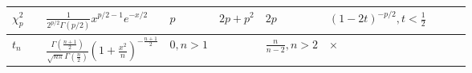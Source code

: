 \documentclass[10pt,landscape]{article}
\begin{document}
\begin{tabular}{llllllllll}
$\chi_p^2$ & $ $ & $\frac{1}{2^{p/2}\Gamma(p/2)}x^{p/2-1}e^{-x/2}$ & $p$ & $2p+p^2$ & $2p$ & $(1-2t)^{-p/2}, t<\frac12$\\
\hline

$t_n$ & $ $ & $\frac{\Gamma(\frac{n+1}2)}{\sqrt{n\pi} \Gamma(\frac{n}2)} (1+\frac{x^2}n)^{-\frac{n+1}2}$ & $0,n>1$ & $ $ & $\frac{n}{n-2},n>2$ & $\times$\\
\hline
\end{tabular}
\end{document}
